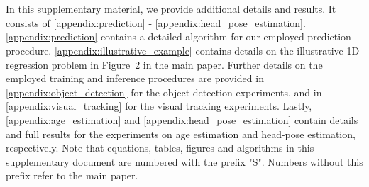 \documentclass[runningheads]{llncs}
\begin{document}
\clearpage











\clearpage

\renewcommand{\thefigure}{S\arabic{figure}}
\setcounter{figure}{0}

\renewcommand{\thetable}{S\arabic{table}}
\setcounter{table}{0}

\renewcommand{\thealgorithm}{S\arabic{algorithm}}
\setcounter{algorithm}{0}

\renewcommand{\theequation}{S\arabic{equation}}
\setcounter{equation}{0}

\makeatletter
\newcommand{\@chapapp}{\relax}\makeatother



\section*{}

In this supplementary material, we provide additional details and results. It consists of \ref{appendix:prediction} - \ref{appendix:head_pose_estimation}. \ref{appendix:prediction} contains a detailed algorithm for our employed prediction procedure. \ref{appendix:illustrative_example} contains details on the illustrative 1D regression problem in Figure~2 in the main paper. Further details on the employed training and inference procedures are provided in \ref{appendix:object_detection} for the object detection experiments, and in \ref{appendix:visual_tracking} for the visual tracking experiments. Lastly, \ref{appendix:age_estimation} and \ref{appendix:head_pose_estimation} contain details and full results for the experiments on age estimation and head-pose estimation, respectively. Note that equations, tables, figures and algorithms in this supplementary document are numbered with the prefix "S". Numbers without this prefix refer to the main paper.
\end{document}
